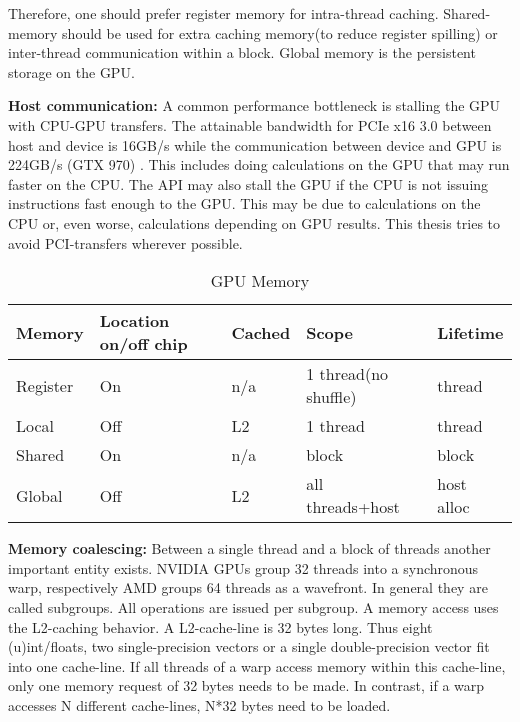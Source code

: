 \documentclass[m,times]{cgMA}
\begin{document}
Therefore, one should prefer register memory for intra-thread caching. Shared-memory should be used for extra caching memory(to reduce register spilling) or inter-thread communication within a block. Global memory is the persistent storage on the GPU.

\textbf{Host communication:} A common performance bottleneck is stalling the GPU with CPU-GPU transfers. The attainable bandwidth for PCIe x16 3.0 between host and device is 16GB/s while the communication between device and GPU is 224GB/s (GTX 970) \cite{NVIDIA:GTX970}. This includes doing calculations on the GPU that may run faster on the CPU. The API may also stall the GPU if the CPU is not issuing instructions fast enough to the GPU. This may be due to calculations on the CPU or, even worse, calculations depending on GPU results. This thesis tries to avoid PCI-transfers wherever possible.

\begin{table}
  \begin{tabular}{ | l | l | l | l | l |}    \hline
    Memory       &Location on/off chip   &Cached   &Scope                &Lifetime   \\\hline
    Register     &On                     &n/a      &1 thread(no shuffle) &thread     \\\hline
    Local        &Off                    &L2       &1 thread             &thread     \\\hline
    Shared       &On                     &n/a      &block                &block      \\\hline
    Global       &Off                    &L2       &all threads+host     &host alloc \\
    \hline
  \end{tabular}
  \caption{GPU Memory \cite{NVIDIA:BEST:PRACTICE}}\label{table:gpu_mem}
\end{table}
\textbf{Memory coalescing:} Between a single thread and a block of threads another important entity exists. NVIDIA GPUs group 32 threads into a synchronous warp, respectively AMD groups 64 threads as a wavefront. In general they are called subgroups. All operations are issued per subgroup. A memory access uses the L2-caching behavior. A L2-cache-line is 32 bytes long. Thus eight (u)int/floats, two single-precision vectors or a single double-precision vector fit into one cache-line. If all threads of a warp access memory within this cache-line, only one memory request of 32 bytes needs to be made. In contrast, if a warp accesses N different cache-lines, N*32 bytes need to be loaded.
\end{document}

